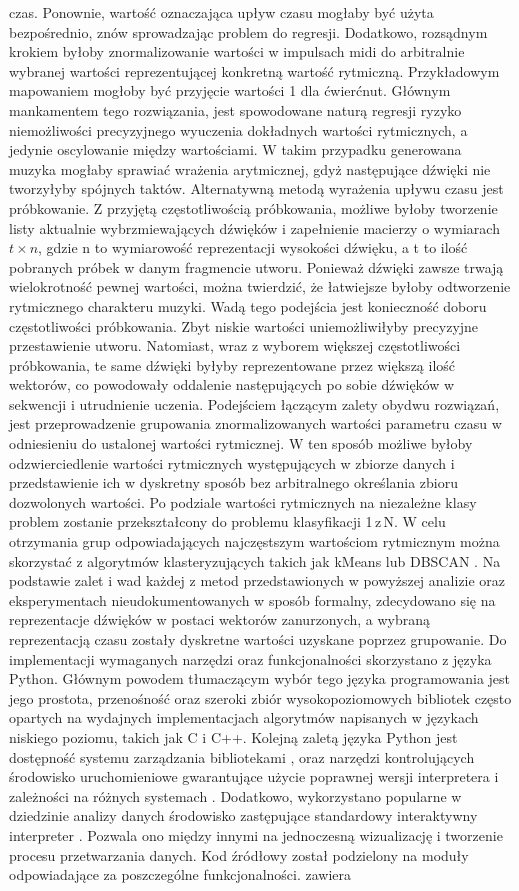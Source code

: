 czas. Ponownie, wartość oznaczająca upływ czasu mogłaby być użyta bezpośrednio, znów sprowadzając problem do regresji. Dodatkowo, rozsądnym krokiem byłoby znormalizowanie wartości w impulsach midi do arbitralnie wybranej wartości reprezentującej konkretną wartość rytmiczną. Przykładowym mapowaniem mogłoby być przyjęcie wartości 1 dla ćwierćnut. Głównym mankamentem tego rozwiązania, jest spowodowane naturą regresji ryzyko niemożliwości precyzyjnego wyuczenia  dokładnych wartości rytmicznych, a jedynie oscylowanie między wartościami. W takim przypadku generowana muzyka mogłaby sprawiać wrażenia arytmicznej, gdyż następujące dźwięki nie tworzyłyby spójnych taktów.  Alternatywną metodą wyrażenia upływu czasu jest próbkowanie. Z przyjętą częstotliwością próbkowania,  możliwe byłoby tworzenie listy aktualnie wybrzmiewających dźwięków i zapełnienie macierzy o wymiarach \(t \times n\), gdzie n to wymiarowość reprezentacji wysokości dźwięku, a t to ilość pobranych próbek w danym fragmencie utworu. Ponieważ dźwięki zawsze trwają wielokrotność pewnej wartości, można twierdzić, że łatwiejsze byłoby  odtworzenie rytmicznego charakteru muzyki. Wadą tego podejścia jest konieczność doboru częstotliwości próbkowania. Zbyt niskie wartości  uniemożliwiłyby precyzyjne przestawienie utworu. Natomiast, wraz z wyborem większej częstotliwości próbkowania, te same dźwięki byłyby reprezentowane przez większą ilość wektorów,  co powodowały oddalenie następujących po sobie dźwięków w sekwencji i utrudnienie uczenia. Podejściem łączącym zalety obydwu rozwiązań, jest przeprowadzenie grupowania znormalizowanych wartości parametru czasu w odniesieniu do ustalonej wartości rytmicznej. W ten sposób możliwe byłoby odzwierciedlenie wartości rytmicznych występujących w zbiorze danych i przedstawienie ich w dyskretny sposób bez arbitralnego określania zbioru dozwolonych wartości.  Po podziale wartości rytmicznych na niezależne klasy problem zostanie przekształcony do problemu klasyfikacji 1\,z\,N.  W celu otrzymania grup odpowiadających najczęstszym wartościom rytmicznym można skorzystać  z algorytmów klasteryzujących takich jak kMeans  lub DBSCAN . Na podstawie zalet i wad każdej z metod przedstawionych w powyższej analizie oraz eksperymentach nieudokumentowanych w sposób formalny, zdecydowano się na reprezentacje dźwięków w postaci wektorów zanurzonych, a wybraną reprezentacją czasu zostały dyskretne wartości uzyskane poprzez grupowanie. Do implementacji wymaganych narzędzi oraz funkcjonalności skorzystano z języka Python. Głównym powodem tłumaczącym wybór tego języka programowania jest jego prostota, przenośność oraz szeroki zbiór wysokopoziomowych bibliotek często opartych na wydajnych implementacjach algorytmów napisanych w językach niskiego poziomu, takich jak C i C++.  Kolejną zaletą języka Python jest dostępność systemu zarządzania bibliotekami  , oraz narzędzi kontrolujących środowisko uruchomieniowe gwarantujące użycie poprawnej wersji interpretera i zależności na różnych systemach  . Dodatkowo, wykorzystano popularne w dziedzinie analizy danych środowisko zastępujące standardowy interaktywny interpreter  . Pozwala ono między innymi na jednoczesną wizualizację i tworzenie procesu przetwarzania danych.  Kod źródłowy został podzielony na moduły odpowiadające za poszczególne funkcjonalności.    zawiera 